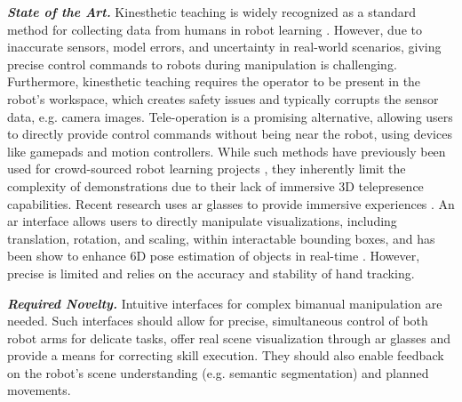 \documentclass{erc-B2}
\begin{document}
\textit{\textbf{State of the Art.}} 
Kinesthetic teaching is widely recognized as a standard method for collecting data from humans in robot learning \cite{Wrede_Emmerich_Grünberg_Nordmann_Swadzba_Steil_2013, Ravichandar_Polydoros_Chernova_Billard_2020, Sukkar_Moreno_Vidal_Calleja_Deuse_2023}. However, due to inaccurate sensors, model errors, and uncertainty in real-world scenarios, giving precise control commands to robots during manipulation is challenging. 
Furthermore, kinesthetic teaching requires the operator to be present in the robot's workspace, which creates safety issues and typically corrupts the sensor data, e.g. camera images. 
Tele-operation is a promising alternative, allowing users to directly provide control commands without being near the robot, using devices like gamepads and motion controllers.
While such methods have previously been used for crowd-sourced robot learning projects \cite{mandlekar2018roboturk}, they inherently limit the complexity of demonstrations due to their lack of immersive 3D telepresence capabilities. 
Recent research uses \gls*{ar} glasses to provide immersive experiences \cite{Mullen_Mosier_Chakrabarti_Chen_White_Losey_2021, Rosen_Whitney_Phillips_Chien_Tompkin_Konidaris_Tellex_2020}. An \gls*{ar} interface allows users to directly manipulate visualizations, including translation, rotation, and scaling, within interactable bounding boxes, and has been show to enhance 6D pose estimation of objects in real-time \cite{sahin2020review, firintepe2021ir}. However, precise is limited and relies on the accuracy and stability of hand tracking. 


\textit{\textbf{Required Novelty.}} Intuitive interfaces for complex bimanual manipulation are needed. Such interfaces should allow for precise, simultaneous control of both robot arms for delicate tasks, offer real scene visualization through \gls*{ar} glasses and provide a means for correcting skill execution. They should also enable feedback on the robot's scene understanding (e.g. semantic segmentation) and planned movements.
\end{document}
